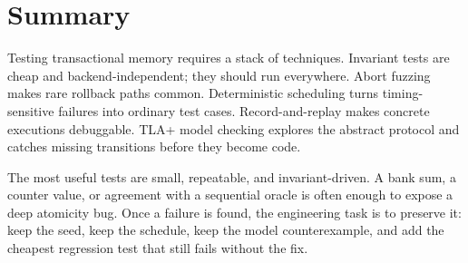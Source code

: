

\section{Summary}

Testing transactional memory requires a stack of techniques. Invariant tests are cheap and backend-independent; they should run everywhere. Abort fuzzing makes rare rollback paths common. Deterministic scheduling turns timing-sensitive failures into ordinary test cases. Record-and-replay makes concrete executions debuggable. TLA+ model checking explores the abstract protocol and catches missing transitions before they become code.

The most useful tests are small, repeatable, and invariant-driven. A bank sum, a counter value, or agreement with a sequential oracle is often enough to expose a deep atomicity bug. Once a failure is found, the engineering task is to preserve it: keep the seed, keep the schedule, keep the model counterexample, and add the cheapest regression test that still fails without the fix.

